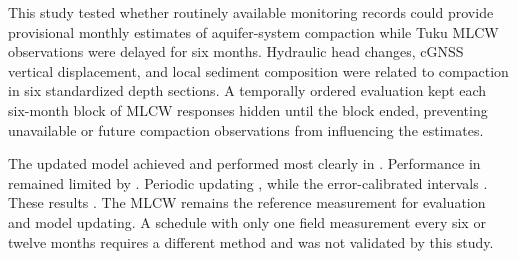 This study tested whether routinely available monitoring records could provide provisional monthly estimates of aquifer-system compaction while Tuku MLCW observations were delayed for six months. Hydraulic head changes, cGNSS vertical displacement, and local sediment composition were related to compaction in six standardized depth sections. A temporally ordered evaluation kept each six-month block of MLCW responses hidden until the block ended, preventing unavailable or future compaction observations from influencing the estimates.

The updated model achieved  and performed most clearly in . Performance in  remained limited by . Periodic updating , while the error-calibrated intervals . These results . The MLCW remains the reference measurement for evaluation and model updating. A schedule with only one field measurement every six or twelve months requires a different method and was not validated by this study.
